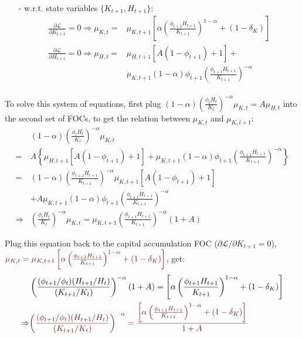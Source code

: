 \documentclass[10pt,landscape,a4paper]{article}
\begin{document}
\begin{multicols*}{3}
\begin{itemize}
    \item[-] w.r.t. state variables $\{K_{t+1},H_{t+1}\}$:
    \begin{align*}
        \frac{\partial \mathcal{L}}{\partial K_{t+1}} =0\Rightarrow  \mu_{K,t}=&\mu_{K,t+1}\left[\alpha\left( \frac{\phi_{t+1}H_{t+1}}{K_{t+1}}\right)^{1-\alpha} + (1-\delta_K)  \right]\\
        \frac{\partial \mathcal{L}}{\partial H_{t+1}}=0\Rightarrow \mu_{H,t}=&\mu_{H,t+1}\left[A(1-\phi_{t+1})+1\right]+\\
         &\mu_{K,t+1}(1-\alpha)\phi_{t+1}\left(\frac{\phi_{t+1}H_{t+1}}{K_{t+1}}\right)^{-\alpha}\\
    \end{align*}
\end{itemize}

To solve this system of equations, first plug $(1-\alpha)\left(\frac{\phi_t H_t}{K_t}\right)^{-\alpha}\mu_{K,t}=A\mu_{H,t}$ into the second set of FOCs, to get the relation between $\mu_{K,t}$ and $\mu_{K,t+1}$:
\begin{align*}
    &(1-\alpha)\left(\frac{\phi_t H_t}{K_t}\right)^{-\alpha}\mu_{K,t}\\
    = & A\left\{ \mu_{H,t+1}\left[A(1-\phi_{t+1})+1\right]+\mu_{K,t+1}(1-\alpha)\phi_{t+1}\left(\frac{\phi_{t+1}H_{t+1}}{K_{t+1}}\right)^{-\alpha} \right\} \\
    = & (1-\alpha)\left(\frac{\phi_{t+1}H_{t+1}}{K_{t+1}}\right)^{-\alpha}\mu_{K,t+1}\left[A(1-\phi_{t+1})+1\right]\\
    &+ A \mu_{K,t+1}(1-\alpha)\phi_{t+1}\left(\frac{\phi_{t+1}H_{t+1}}{K_{t+1}}\right)^{-\alpha}\\
    \Rightarrow & \left(\frac{\phi_t H_t}{K_t}\right)^{-\alpha}\mu_{K,t} = \mu_{K,t+1}\left(\frac{\phi_{t+1}H_{t+1}}{K_{t+1}}\right)^{-\alpha}(1+A)
\end{align*}

Plug this equation back to the capital accumulation FOC ($\partial \mathcal{L}/\partial K_{t+1}=0$), ${\color{myred}\mu_{K,t}=\mu_{K,t+1}\left[\alpha\left( \frac{\phi_{t+1}H_{t+1}}{K_{t+1}}\right)^{1-\alpha} + (1-\delta_K)  \right]}$, get: 
\begin{align*}
    &\left(\frac{(\phi_{t+1}/\phi_t)(H_{t+1}/H_t)}{(K_{t+1}/K_t)}\right)^{-\alpha}(1+A) = \left[\alpha\left( \frac{\phi_{t+1}H_{t+1}}{K_{t+1}}\right)^{1-\alpha} + (1-\delta_K)  \right]\\
    \Rightarrow & {\color{myred}\left(\frac{(\phi_{t+1}/\phi_t)(H_{t+1}/H_t)}{(K_{t+1}/K_t)}\right)^{-\alpha}=\frac{\left[\alpha\left( \frac{\phi_{t+1}H_{t+1}}{K_{t+1}}\right)^{1-\alpha} + (1-\delta_K)  \right]}{1+A}}
\end{align*}


\end{multicols*}
\end{document}
